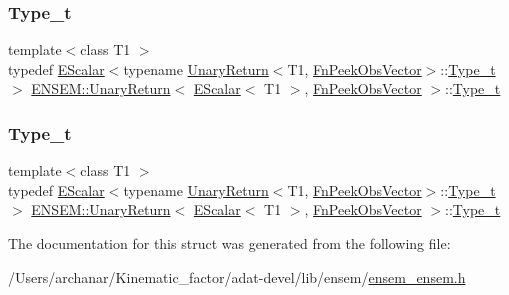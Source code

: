 \subsubsection{\texorpdfstring{Type\_t}{Type\_t}\hspace{0.1cm}{\footnotesize\ttfamily [2/3]}}
{\footnotesize\ttfamily template$<$class T1 $>$ \\
typedef \mbox{\hyperlink{classENSEM_1_1EScalar}{E\+Scalar}}$<$typename \mbox{\hyperlink{structENSEM_1_1UnaryReturn}{Unary\+Return}}$<$T1, \mbox{\hyperlink{structENSEM_1_1FnPeekObsVector}{Fn\+Peek\+Obs\+Vector}}$>$\+::\mbox{\hyperlink{structENSEM_1_1UnaryReturn_3_01EScalar_3_01T1_01_4_00_01FnPeekObsVector_01_4_ab344f63bc162dc2012f97d027b589de9}{Type\+\_\+t}}$>$ \mbox{\hyperlink{structENSEM_1_1UnaryReturn}{E\+N\+S\+E\+M\+::\+Unary\+Return}}$<$ \mbox{\hyperlink{classENSEM_1_1EScalar}{E\+Scalar}}$<$ T1 $>$, \mbox{\hyperlink{structENSEM_1_1FnPeekObsVector}{Fn\+Peek\+Obs\+Vector}} $>$\+::\mbox{\hyperlink{structENSEM_1_1UnaryReturn_3_01EScalar_3_01T1_01_4_00_01FnPeekObsVector_01_4_ab344f63bc162dc2012f97d027b589de9}{Type\+\_\+t}}}

\mbox{\label{structENSEM_1_1UnaryReturn_3_01EScalar_3_01T1_01_4_00_01FnPeekObsVector_01_4_ab344f63bc162dc2012f97d027b589de9}} 
\subsubsection{\texorpdfstring{Type\_t}{Type\_t}\hspace{0.1cm}{\footnotesize\ttfamily [3/3]}}
{\footnotesize\ttfamily template$<$class T1 $>$ \\
typedef \mbox{\hyperlink{classENSEM_1_1EScalar}{E\+Scalar}}$<$typename \mbox{\hyperlink{structENSEM_1_1UnaryReturn}{Unary\+Return}}$<$T1, \mbox{\hyperlink{structENSEM_1_1FnPeekObsVector}{Fn\+Peek\+Obs\+Vector}}$>$\+::\mbox{\hyperlink{structENSEM_1_1UnaryReturn_3_01EScalar_3_01T1_01_4_00_01FnPeekObsVector_01_4_ab344f63bc162dc2012f97d027b589de9}{Type\+\_\+t}}$>$ \mbox{\hyperlink{structENSEM_1_1UnaryReturn}{E\+N\+S\+E\+M\+::\+Unary\+Return}}$<$ \mbox{\hyperlink{classENSEM_1_1EScalar}{E\+Scalar}}$<$ T1 $>$, \mbox{\hyperlink{structENSEM_1_1FnPeekObsVector}{Fn\+Peek\+Obs\+Vector}} $>$\+::\mbox{\hyperlink{structENSEM_1_1UnaryReturn_3_01EScalar_3_01T1_01_4_00_01FnPeekObsVector_01_4_ab344f63bc162dc2012f97d027b589de9}{Type\+\_\+t}}}



The documentation for this struct was generated from the following file\+:\begin{DoxyCompactItemize}
\item 
/\+Users/archanar/\+Kinematic\+\_\+factor/adat-\/devel/lib/ensem/\mbox{\hyperlink{adat-devel_2lib_2ensem_2ensem__ensem_8h}{ensem\+\_\+ensem.\+h}}\end{DoxyCompactItemize}
